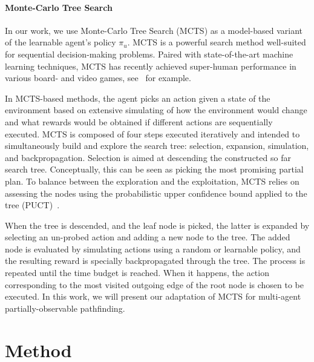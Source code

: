 \documentclass[letterpaper]{article} %
\begin{document}
\paragraph{Monte-Carlo Tree Search} In our work, we use Monte-Carlo Tree Search (MCTS) as a model-based variant of the learnable agent's policy $\pi_u$. MCTS is a powerful  search method well-suited for sequential decision-making problems. Paired with state-of-the-art machine learning techniques, MCTS has recently achieved super-human performance in various board- and video games, see~\cite{silver2017mastering,ye2021mastering} for example. 

In MCTS-based methods, the agent picks an action given a state of the environment based on extensive simulating of how the environment would change and what rewards would be obtained if different actions are sequentially executed. MCTS is composed of four steps executed iteratively and intended to simultaneously build and explore the search tree: selection, expansion, simulation, and backpropagation. Selection is aimed at descending the constructed so far search tree. Conceptually, this can be seen as picking the most promising partial plan. To balance between the exploration and the exploitation, MCTS relies on assessing the nodes using the probabilistic upper confidence bound applied to the tree (PUCT)~\cite{rosin_multi-armed_2011}.



When the tree is descended, and the leaf node is picked, the latter is expanded by selecting an un-probed action and adding a new node to the tree. The added node is evaluated by simulating actions using a random or learnable policy, and the resulting reward is specially backpropagated through the tree. The process is repeated until the time budget is reached. When it happens, the action corresponding to the most visited outgoing edge of the root node is chosen to be executed. In this work, we will present our adaptation of MCTS for multi-agent partially-observable pathfinding.


\section{Method}
\end{document}
